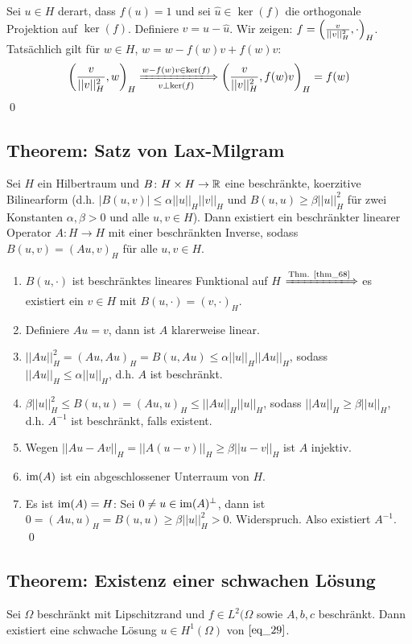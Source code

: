 	Sei $u \in H$ derart, dass $f(u) = 1$ und sei $\hat{u} \in \ker(f)$ die orthogonale Projektion auf $\ker(f)$. Definiere $v = u - \hat{u}$. Wir zeigen: $f = \enbrace*{\frac{v}{||v||^2_H},\cdot}_H$. Tatsächlich gilt für $w \in H$, $w = w-f(w)v + f(w)v$:
	\[ \enbrace*{\frac{v}{||v||_H^2},w}_H \xLongrightarrow[v \perp \ker(f)]{w - f(w)v \in \ker(f)} \enbrace*{\frac{v}{||v||_H^2},f(w)v}_H = f(w) \] \qed
	
\subsection{Theorem: Satz von Lax-Milgram}
\label{thm_70}
	Sei $H$ ein Hilbertraum und $B\colon H \times H \rightarrow \RR$ \marginnote{[70]} eine beschränkte, koerzitive Bilinearform (d.h. $|B(u,v)| \leq \alpha ||u||_H ||v||_H$ und $B(u,u) \geq \beta ||u||^2_H$ für zwei Konstanten $\alpha,\beta > 0$ und alle $u,v \in H$). Dann existiert ein beschränkter linearer Operator $A \colon H \rightarrow H$ mit einer beschränkten Inverse, sodass $B(u,v) = (Au,v)_H$ für alle $u,v \in H$.
	
	\begin{enumerate}[1.]
		\item $B(u,\cdot)$ ist beschränktes lineares Funktional auf $H$ $\xLongrightarrow{\text{Thm. \ref{thm_68}}}$ es existiert ein $v \in H$ mit $B(u,\cdot) = (v,\cdot)_H$.
		\item Definiere $Au = v$, dann ist $A$ klarerweise linear.
		\item $||Au||_H^2 = (Au,Au)_H = B(u,Au) \leq \alpha ||u||_H ||Au||_H$, sodass $||Au||_H \leq \alpha ||u||_H$, d.h. $A$ ist beschränkt.
		\item $\beta ||u||_H^2 \leq B(u,u) = (Au,u)_H \leq ||Au||_H ||u||_H$, sodass $||Au||_H \geq \beta ||u||_H$, d.h. $A^{-1}$ ist beschränkt, falls existent.
		\item Wegen $||Au-Av||_H = ||A(u-v)||_H \geq \beta ||u-v||_H$ ist $A$ injektiv.
		\item $\im(A)$ ist ein abgeschlossener Unterraum von $H$.
		\item Es ist $\im(A) = H$: Sei $0 \neq u \in \im(A)^\perp$, dann ist $0 = (Au,u)_H = B(u,u) \geq \beta ||u||_H^2 > 0$. Widerspruch. Also existiert $A^{-1}$. \qed
	\end{enumerate}
	
\subsection{Theorem: Existenz einer schwachen Lösung}
\label{thm_71}
	Sei $\Omega$ beschränkt mit Lipschitzrand und $f \in L^2(\Omega$ sowie $A,b,c$ beschränkt. \marginnote{[71]} Dann existiert eine schwache Lösung $u \in H^1(\Omega)$ von $\eqref{eq_29}$.

